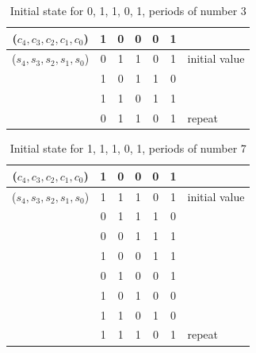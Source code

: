 \documentclass[a4paper, 11pt]{article}
\begin{document}
\begin{table}[htbp]
    \centering
    \caption{Initial state for 0, 1, 1, 0, 1, periods of number 3}
      \begin{tabular}{ccccccl}
      \hline
      ($c_{4}, c_{3}, c_{2}, c_{1}, c_{0} $) & 1     & 0     & 0     & 0     & 1     &  \bigstrut\\
      \hline
      ($s_{4}, s_{3}, s_{2}, s_{1}, s_{0} $) & 0     & 1     & 1     & 0     & 1     & initial value \bigstrut\\
      \hline
      \multirow{3}[6]{*}{} & 1     & 0     & 1     & 1     & 0     & \multirow{2}[4]{*}{} \bigstrut\\
  \cline{2-6}          & 1     & 1     & 0     & 1     & 1     &  \bigstrut\\
  \cline{2-7}          & 0     & 1     & 1     & 0     & 1     & repeat \bigstrut\\
  \cline{2-7}    \end{tabular}%
    \label{tab:Table 2}%
  \end{table}%
\begin{table}[htbp]
    \centering
    \caption{Initial state for 1, 1, 1, 0, 1, periods of number 7}
      \begin{tabular}{rcccccl}
      \hline
      \multicolumn{1}{c}{($c_{4}, c_{3}, c_{2}, c_{1}, c_{0} $)} & 1     & 0     & 0     & 0     & 1     &  \bigstrut\\
      \hline
      \multicolumn{1}{c}{($s_{4}, s_{3}, s_{2}, s_{1}, s_{0} $)} & 1     & 1     & 1     & 0     & 1     & initial value \bigstrut\\
      \hline
      \multirow{3}[6]{*}{} & 0     & 1     & 1     & 1     & 0     & \multirow{2}[4]{*}{} \bigstrut\\
  \cline{2-6}          & 0     & 0     & 1     & 1     & 1     &  \bigstrut\\
  \cline{2-6}          & 1     & 0     & 0     & 1     & 1     &  \bigstrut\\
  \cline{2-6}          & 0     & 1     & 0     & 0     & 1     &  \bigstrut\\
  \cline{2-6}          & 1     & 0     & 1     & 0     & 0     &  \bigstrut\\
  \cline{2-6}          & 1     & 1     & 0     & 1     & 0     &  \bigstrut\\
  \cline{2-7}          & 1     & 1     & 1     & 0     & 1     & repeat \bigstrut\\
  \cline{2-7}    \end{tabular}%
    \label{tab:Table 3}%
  \end{table}%
\end{document}
